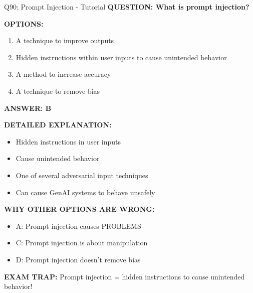 \documentclass[8pt]{beamer}
\begin{document}
	\begin{frame}{Q90: Prompt Injection - Tutorial}
		\fontsize{6.5}{7.5}\selectfont
		\textbf{QUESTION: What is prompt injection?}
		
		\vspace{0.1cm}
		\textbf{OPTIONS:}
		\begin{enumerate}
			\item A technique to improve outputs
			\item Hidden instructions within user inputs to cause unintended behavior
			\item A method to increase accuracy
			\item A technique to remove bias
		\end{enumerate}
		
		\vspace{0.1cm}
		\textcolor{myblue}{\textbf{ANSWER: B}}
		
		\vspace{0.1cm}
		\textbf{DETAILED EXPLANATION:}
		\begin{itemize}
			\item Hidden instructions in user inputs
			\item Cause unintended behavior
			\item One of several adversarial input techniques
			\item Can cause GenAI systems to behave unsafely
		\end{itemize}
		
		\vspace{0.1cm}
		\textcolor{myred}{\textbf{WHY OTHER OPTIONS ARE WRONG:}}
		\begin{itemize}
			\item \textcolor{myred}{A:} Prompt injection causes PROBLEMS
			\item \textcolor{myred}{C:} Prompt injection is about manipulation
			\item \textcolor{myred}{D:} Prompt injection doesn't remove bias
		\end{itemize}
		
		\textcolor{myred}{\textbf{EXAM TRAP:}} Prompt injection = \textcolor{myblue}{hidden instructions to cause unintended behavior}!
	\end{frame}
	
\end{document}
